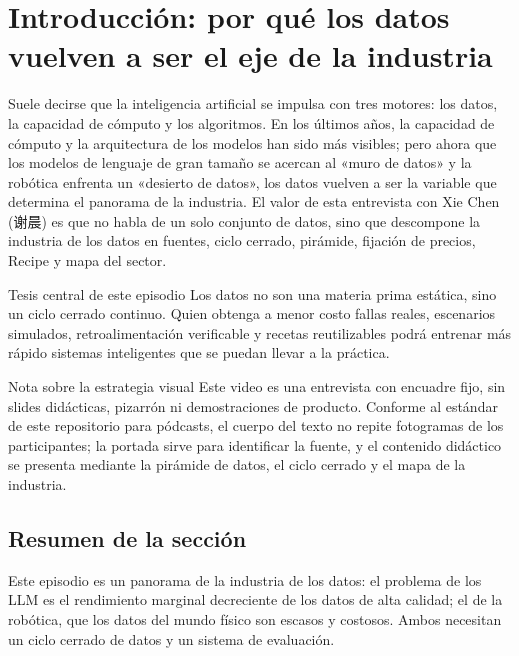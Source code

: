 \section{Introducción: por qué los datos vuelven a ser el eje de la industria}

Suele decirse que la inteligencia artificial se impulsa con tres motores: los datos, la capacidad de cómputo y los algoritmos. En los últimos años, la capacidad de cómputo y la arquitectura de los modelos han sido más visibles; pero ahora que los modelos de lenguaje de gran tamaño se acercan al «muro de datos» y la robótica enfrenta un «desierto de datos», los datos vuelven a ser la variable que determina el panorama de la industria. El valor de esta entrevista con Xie Chen (谢晨) es que no habla de un solo conjunto de datos, sino que descompone la industria de los datos en fuentes, ciclo cerrado, pirámide, fijación de precios, Recipe y mapa del sector.

\begin{importantbox}{Tesis central de este episodio}
Los datos no son una materia prima estática, sino un ciclo cerrado continuo. Quien obtenga a menor costo fallas reales, escenarios simulados, retroalimentación verificable y recetas reutilizables podrá entrenar más rápido sistemas inteligentes que se puedan llevar a la práctica.
\end{importantbox}

\begin{knowledgebox}{Nota sobre la estrategia visual}
Este video es una entrevista con encuadre fijo, sin slides didácticas, pizarrón ni demostraciones de producto. Conforme al estándar de este repositorio para pódcasts, el cuerpo del texto no repite fotogramas de los participantes; la portada sirve para identificar la fuente, y el contenido didáctico se presenta mediante la pirámide de datos, el ciclo cerrado y el mapa de la industria.
\end{knowledgebox}

\subsection{Resumen de la sección}

Este episodio es un panorama de la industria de los datos: el problema de los LLM es el rendimiento marginal decreciente de los datos de alta calidad; el de la robótica, que los datos del mundo físico son escasos y costosos. Ambos necesitan un ciclo cerrado de datos y un sistema de evaluación.
